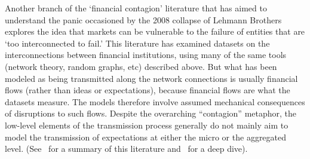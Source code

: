 
Another branch of the `financial contagion' literature that has aimed to understand the panic occasioned by the 2008 collapse of Lehmann Brothers explores the idea that markets can be vulnerable to the failure of entities that are `too interconnected to fail.' This literature has examined datasets on the interconnections between financial institutions, using many of the same tools (network theory, random graphs, etc) described above.  But what has been modeled as being transmitted along the network connections is usually financial flows (rather than ideas or expectations), because financial flows are what the datasets measure.  The models therefore involve assumed mechanical consequences of disruptions to such flows.  Despite the overarching ``contagion'' metaphor, the low-level elements of the transmission process generally do not mainly aim to model the transmission of expectations at either the micro or the aggregated level.  (See~\cite{glasserman2016contagion} for a summary of this literature and~\cite{cabrales2015financial} for a deep dive).


